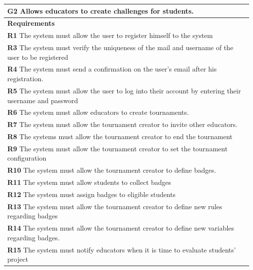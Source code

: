 \begin{table}[H]
    \begin{tabularx}{\textwidth}{X}
        \toprule
        \textbf{G2} Allows educators to create challenges for students.                                                    \\ \midrule
        \textbf{Requirements}                                                                                                        \\ \midrule
        \textbf{R1} The system must allow the user to register himself to the system                                                   \\
        \textbf{R3} The system must verify the uniqueness of the mail and username of the user to be registered                                       \\ 
        \textbf{R4} The system must send a confirmation on the user's email after his registration.                         \\ 
        \textbf{R5} The system must allow the user to log into their account by entering their username and password           \\
        \textbf{R6} The system must allow educators to create tournaments.              \\ 
        \textbf{R7} The system must allow the tournament creator to invite other educators.         \\ 
        \textbf{R8} The systems must allow the tournament creator to end the tournament     \\ 
        \textbf{R9} The system must allow the tournament creator to set the tournament configuration          \\ 
        \textbf{R10} The system must allow the tournament creator to define badges.      \\ 
        \textbf{R11} The system must allow students to collect badges        \\ 
        \textbf{R12} The system must assign badges to eligible students          \\  
        \textbf{R13} The system must allow the tournament creator to define new rules regarding badges  \\ 
        \textbf{R14} The system must allow the tournament creator to define new variables regarding badges.         \\ 
        \textbf{R15} The system must notify educators when it is time to evaluate students' project      \\ 

\end{tabularx}
\end{table}
